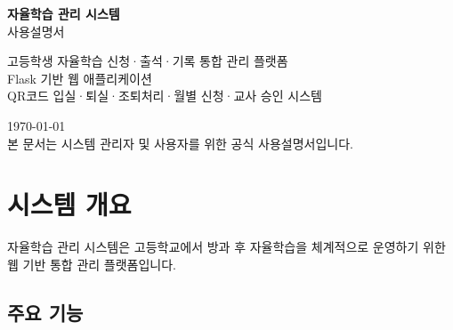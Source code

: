\documentclass[a4paper,12pt]{article}
\begin{document}

\begin{titlepage}
\centering
\vspace*{3cm}

{\Huge\bfseries\color{primary} 자율학습 관리 시스템}\\[0.8em]
{\LARGE 사용설명서}\\[3cm]

\begin{tcolorbox}[
    enhanced, width=0.8\textwidth,
    colback=primary!10, colframe=primary,
    arc=8pt,
]
\centering
\Huge
고등학생 자율학습 신청·출석·기록 통합 관리 플랫폼\\[0.5em]
\large
Flask 기반 웹 애플리케이션 \\
QR코드 입실·퇴실·조퇴처리·월별 신청·교사 승인 시스템
\end{tcolorbox}

\vfill

{\large \today}\\[0.5em]
{\normalsize 본 문서는 시스템 관리자 및 사용자를 위한 공식 사용설명서입니다.}
\end{titlepage}

\tableofcontents
\newpage

\section{시스템 개요}

자율학습 관리 시스템은 고등학교에서 방과 후 자율학습을 체계적으로 운영하기 위한 웹 기반 통합 관리 플랫폼입니다.

\subsection{주요 기능}
\end{document}
